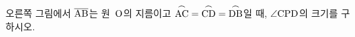 \noindent\begin{minipage}[t]{0.58\linewidth}\vspace{0pt}\raggedright 오른쪽 그림에서 $\overline{\mathrm{AB}}$는 원~$\mathrm{O}$의 지름이고 $\overset{\frown}{\mathrm{AC}}=\overset{\frown}{\mathrm{CD}}=\overset{\frown}{\mathrm{DB}}$일 때, $\angle\mathrm{CPD}$의 크기를 구하시오.\end{minipage}\hfill\begin{minipage}[t]{0.4\linewidth}\vspace{0pt}\centering \resizebox{\ifdim\width>\linewidth\linewidth\else\width\fi}{!}{}\end{minipage}\par
